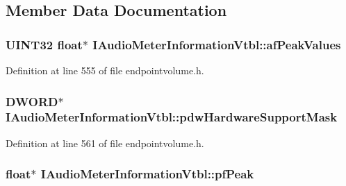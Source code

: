 \subsection{Member Data Documentation}
\subsubsection[{\texorpdfstring{af\+Peak\+Values}{afPeakValues}}]{\setlength{\rightskip}{0pt plus 5cm}U\+I\+N\+T32 float$\ast$ I\+Audio\+Meter\+Information\+Vtbl\+::af\+Peak\+Values}\hypertarget{struct_i_audio_meter_information_vtbl_abdc52aa7adfc696c46057e9a6d2223ed}{}\label{struct_i_audio_meter_information_vtbl_abdc52aa7adfc696c46057e9a6d2223ed}


Definition at line 555 of file endpointvolume.\+h.

\subsubsection[{\texorpdfstring{pdw\+Hardware\+Support\+Mask}{pdwHardwareSupportMask}}]{ {\bf D\+W\+O\+RD}$\ast$ I\+Audio\+Meter\+Information\+Vtbl\+::pdw\+Hardware\+Support\+Mask}\hypertarget{struct_i_audio_meter_information_vtbl_a872f52800e4baa961ccd83ec0c1c7688}{}\label{struct_i_audio_meter_information_vtbl_a872f52800e4baa961ccd83ec0c1c7688}


Definition at line 561 of file endpointvolume.\+h.

\subsubsection[{\texorpdfstring{pf\+Peak}{pfPeak}}]{\setlength{\rightskip}{0pt plus 5cm}float$\ast$ I\+Audio\+Meter\+Information\+Vtbl\+::pf\+Peak}\hypertarget{struct_i_audio_meter_information_vtbl_aead09c02703ec1653d18cd6c749f57e2}{}\label{struct_i_audio_meter_information_vtbl_aead09c02703ec1653d18cd6c749f57e2}


